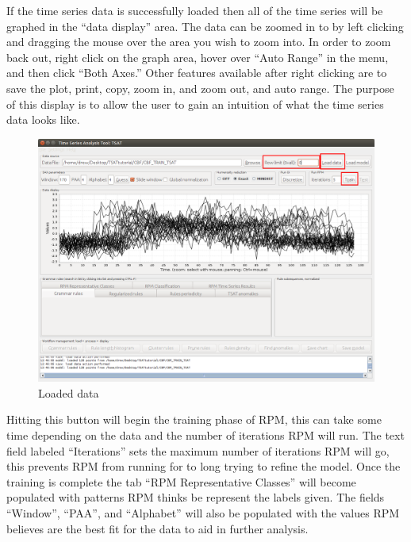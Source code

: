 \documentclass[titlepage, letterpaper, 12pt]{article}
\begin{document}
If the time series data is successfully loaded then all of the time series will be graphed in the ``data display'' area.  The data can be zoomed in to by left clicking and dragging the mouse over the area you wish to zoom into.  In order to zoom back out, right click on the graph area, hover over ``Auto Range'' in the menu, and then click ``Both Axes.''  Other features available after right clicking are to save the plot, print, copy, zoom in, and zoom out, and auto range.  The purpose of this display is to allow the user to gain an intuition of what the time series data looks like.

\begin{figure}[H]
	\includegraphics[width=\textwidth]{TSAT-training-step-4}
	\caption{Loaded data}
	\label{fig:TSAT-training-step-4}
\end{figure}

\newpage
Hitting this button will begin the training phase of RPM, this can take some time depending on the data and the number of iterations RPM will run. The text field labeled ``Iterations'' sets the maximum number of iterations RPM will go, this prevents RPM from running for to long trying to refine the model. Once the training is complete the tab ``RPM Representative Classes'' will become populated with patterns RPM thinks be represent the labels given. The fields ``Window'', ``PAA'', and ``Alphabet'' will also be populated with the values RPM believes are the best fit for the data to aid in further analysis. 
\end{document}
